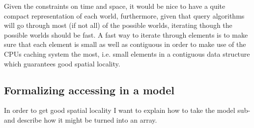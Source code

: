 




Given the constraints on time and space, it would be nice to have a quite compact representation of each world, furthermore, given that query algorithms will go through most (if not all) of the possible worlds, iterating though the possible worlds should be fast. A fast way to iterate through elements is to make sure that each element is small as well as contiguous in order to make use of the CPUs caching system the most, i.e. small elements in a contiguous data structure which guarantees good spatial locality.



\subsection{Formalizing accessing in a model} \label{sec:model-access}
In order to get good spatial locality I want to explain how to take the model sub-\KTfourfiveN and describe how it might be turned into an array.

